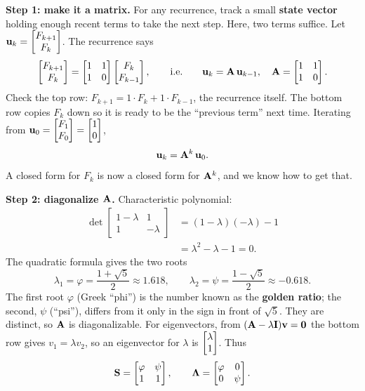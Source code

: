 \textbf{Step 1: make it a matrix.} For any recurrence, track a
small \textbf{state vector} holding enough recent terms to take the next step.
Here, two terms suffice. Let $\mathbf{u}_k = \begin{bmatrix}F_{k+1}\\ F_k\end{bmatrix}$. The recurrence
says
\[
  \begin{bmatrix}F_{k+1}\\F_k\end{bmatrix} = \begin{bmatrix} 1 & 1 \\ 1 & 0 \end{bmatrix}\begin{bmatrix}F_k\\F_{k-1}\end{bmatrix},
  \qquad\text{i.e.}\qquad
  \mathbf{u}_k = \mathbf{A}\,\mathbf{u}_{k-1},
  \quad
  \mathbf{A} = \begin{bmatrix} 1 & 1 \\ 1 & 0 \end{bmatrix}.
\]
Check the top row: $F_{k+1} = 1\cdot F_k + 1\cdot F_{k-1}$, the recurrence
itself. The bottom row copies $F_k$ down so it is ready to be the ``previous
term'' next time. Iterating from $\mathbf{u}_0 = \begin{bmatrix}F_1\\F_0\end{bmatrix} = \begin{bmatrix}1\\0\end{bmatrix}$,
\[
  \mathbf{u}_k = \mathbf{A}^k\,\mathbf{u}_0.
\]
A closed form for $F_k$ is now a closed form for $\mathbf{A}^k$, and we know
how to get that.

\textbf{Step 2: diagonalize $\mathbf{A}$.} Characteristic polynomial:
\begin{align*}
  \det\begin{bmatrix} 1-\lambda & 1 \\ 1 & -\lambda \end{bmatrix}
  &= (1-\lambda)(-\lambda) - 1 \\
  &= \lambda^2 - \lambda - 1 = 0.
\end{align*}
The quadratic formula gives the two roots
\[
  \lambda_1 = \varphi = \frac{1+\sqrt5}{2} \approx 1.618,
  \qquad
  \lambda_2 = \psi = \frac{1-\sqrt5}{2} \approx -0.618.
\]
The first root $\varphi$ (Greek ``phi'') is the number known as the
\textbf{golden ratio}; the second, $\psi$ (``psi''), differs from it only in the
sign in front of $\sqrt5$.
They are distinct, so $\mathbf{A}$ is diagonalizable. For eigenvectors, from
$(\mathbf{A}-\lambda\mathbf{I})\mathbf{v}=\mathbf{0}$ the bottom row gives $v_1 = \lambda v_2$,
so an eigenvector for $\lambda$ is $\begin{bmatrix}\lambda\\1\end{bmatrix}$. Thus
\[
  \mathbf{S} = \begin{bmatrix} \varphi & \psi \\ 1 & 1 \end{bmatrix},
  \qquad
  \mathbf{\Lambda} = \begin{bmatrix} \varphi & 0 \\ 0 & \psi \end{bmatrix}.
\]

